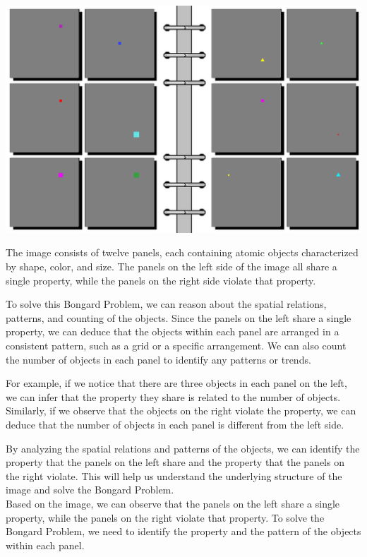 \begin{tcolorbox}[breakable,enhanced jigsaw,opacityback=0,]
	\centering
	\includegraphics[width=.8\linewidth]{imgs/bongard/easy-1.png}\\
	\begin{dialogue}
		 The image consists of twelve panels, each containing atomic objects characterized by shape, color, and size. The panels on the left side of the image all share a single property, while the panels on the right side violate that property.
		
		To solve this Bongard Problem, we can reason about the spatial relations, patterns, and counting of the objects. Since the panels on the left share a single property, we can deduce that the objects within each panel are arranged in a consistent pattern, such as a grid or a specific arrangement. We can also count the number of objects in each panel to identify any patterns or trends.
		
		For example, if we notice that there are three objects in each panel on the left, we can infer that the property they share is related to the number of objects. Similarly, if we observe that the objects on the right violate the property, we can deduce that the number of objects in each panel is different from the left side.
		
		By analyzing the spatial relations and patterns of the objects, we can identify the property that the panels on the left share and the property that the panels on the right violate. This will help us understand the underlying structure of the image and solve the Bongard Problem.
		\\
		 Based on the image, we can observe that the panels on the left share a single property, while the panels on the right violate that property. To solve the Bongard Problem, we need to identify the property and the pattern of the objects within each panel.
		

\end{dialogue}
\end{tcolorbox}
